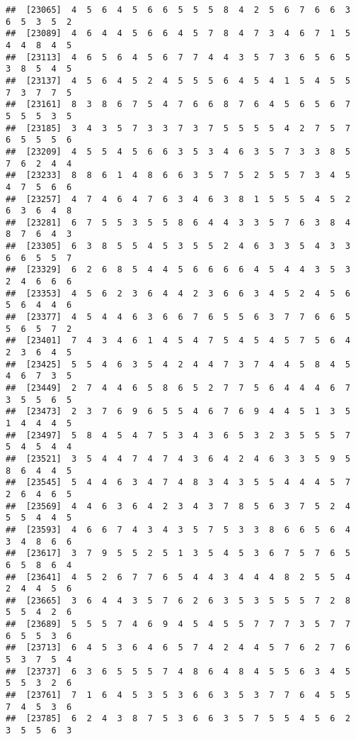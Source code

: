 \documentclass[
]{book}
\begin{document}
\begin{verbatim}
##  [23065]  4  5  6  4  5  6  6  5  5  5  8  4  2  5  6  7  6  6  3  6  5  3  5  2
##  [23089]  4  6  4  4  5  6  6  4  5  7  8  4  7  3  4  6  7  1  5  4  4  8  4  5
##  [23113]  4  6  5  6  4  5  6  7  7  4  4  3  5  7  3  6  5  6  5  3  8  5  4  5
##  [23137]  4  5  6  4  5  2  4  5  5  5  6  4  5  4  1  5  4  5  5  7  3  7  7  5
##  [23161]  8  3  8  6  7  5  4  7  6  6  8  7  6  4  5  6  5  6  7  5  5  5  3  5
##  [23185]  3  4  3  5  7  3  3  7  3  7  5  5  5  5  4  2  7  5  7  6  5  5  5  6
##  [23209]  4  5  5  4  5  6  6  3  5  3  4  6  3  5  7  3  3  8  5  7  6  2  4  4
##  [23233]  8  8  6  1  4  8  6  6  3  5  7  5  2  5  5  7  3  4  5  4  7  5  6  6
##  [23257]  4  7  4  6  4  7  6  3  4  6  3  8  1  5  5  5  4  5  2  6  3  6  4  8
##  [23281]  6  7  5  5  3  5  5  8  6  4  4  3  3  5  7  6  3  8  4  8  7  6  4  3
##  [23305]  6  3  8  5  5  4  5  3  5  5  2  4  6  3  3  5  4  3  3  6  6  5  5  7
##  [23329]  6  2  6  8  5  4  4  5  6  6  6  6  4  5  4  4  3  5  3  2  4  6  6  6
##  [23353]  4  5  6  2  3  6  4  4  2  3  6  6  3  4  5  2  4  5  6  5  6  4  4  6
##  [23377]  4  5  4  4  6  3  6  6  7  6  5  5  6  3  7  7  6  6  5  5  6  5  7  2
##  [23401]  7  4  3  4  6  1  4  5  4  7  5  4  5  4  5  7  5  6  4  2  3  6  4  5
##  [23425]  5  5  4  6  3  5  4  2  4  4  7  3  7  4  4  5  8  4  5  4  6  7  3  5
##  [23449]  2  7  4  4  6  5  8  6  5  2  7  7  5  6  4  4  4  6  7  3  5  5  6  5
##  [23473]  2  3  7  6  9  6  5  5  4  6  7  6  9  4  4  5  1  3  5  1  4  4  4  5
##  [23497]  5  8  4  5  4  7  5  3  4  3  6  5  3  2  3  5  5  5  7  5  4  5  4  4
##  [23521]  3  5  4  4  7  4  7  4  3  6  4  2  4  6  3  3  5  9  5  8  6  4  4  5
##  [23545]  5  4  4  6  3  4  7  4  8  3  4  3  5  5  4  4  4  5  7  2  6  4  6  5
##  [23569]  4  4  6  3  6  4  2  3  4  3  7  8  5  6  3  7  5  2  4  5  5  4  4  5
##  [23593]  4  6  6  7  4  3  4  3  5  7  5  3  3  8  6  6  5  6  4  3  4  8  6  6
##  [23617]  3  7  9  5  5  2  5  1  3  5  4  5  3  6  7  5  7  6  5  6  5  8  6  4
##  [23641]  4  5  2  6  7  7  6  5  4  4  3  4  4  4  8  2  5  5  4  2  4  4  5  6
##  [23665]  3  6  4  4  3  5  7  6  2  6  3  5  3  5  5  5  7  2  8  5  5  4  2  6
##  [23689]  5  5  5  7  4  6  9  4  5  4  5  5  7  7  7  3  5  7  7  6  5  5  3  6
##  [23713]  6  4  5  3  6  4  6  5  7  4  2  4  4  5  7  6  2  7  6  5  3  7  5  4
##  [23737]  6  3  6  5  5  5  7  4  8  6  4  8  4  5  5  6  3  4  5  5  5  3  2  6
##  [23761]  7  1  6  4  5  3  5  3  6  6  3  5  3  7  7  6  4  5  5  7  4  5  3  6
##  [23785]  6  2  4  3  8  7  5  3  6  6  3  5  7  5  5  4  5  6  2  3  5  5  6  3

\end{verbatim}
\end{document}
